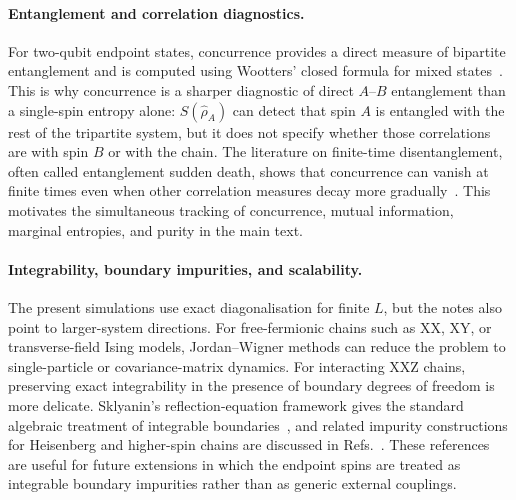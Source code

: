 \documentclass[12pt,a4paper]{article}
\newcommand{\rhohat}{\hat{\rho}}
\begin{document}
\paragraph{Entanglement and correlation diagnostics.}
For two-qubit endpoint states, concurrence provides a direct measure of
bipartite entanglement and is computed using Wootters' closed formula for mixed
states~\cite{wootters1998}.  This is why concurrence is a sharper diagnostic of
direct $A$--$B$ entanglement than a single-spin entropy alone: $S(\rhohat_A)$ can
detect that spin $A$ is entangled with the rest of the tripartite system, but it
does not specify whether those correlations are with spin $B$ or with the chain.
The literature on finite-time disentanglement, often called entanglement sudden
death, shows that concurrence can vanish at finite times even when other
correlation measures decay more gradually~\cite{yu2004}.  This motivates the
simultaneous tracking of concurrence, mutual information, marginal entropies,
and purity in the main text.

\paragraph{Integrability, boundary impurities, and scalability.}
The present simulations use exact diagonalisation for finite $L$, but the notes
also point to larger-system directions.  For free-fermionic chains such as XX,
XY, or transverse-field Ising models, Jordan--Wigner methods can reduce the
problem to single-particle or covariance-matrix dynamics.  For interacting XXZ
chains, preserving exact integrability in the presence of boundary degrees of
freedom is more delicate.  Sklyanin's reflection-equation framework gives the
standard algebraic treatment of integrable boundaries~\cite{sklyanin1988}, and
related impurity constructions for Heisenberg and higher-spin chains are
discussed in Refs.~\cite{andrei1984,hou1999}.  These references are useful for
future extensions in which the endpoint spins are treated as integrable boundary
impurities rather than as generic external couplings.

\end{document}
